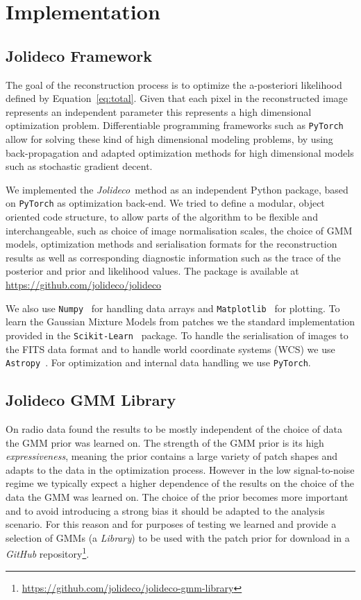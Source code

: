 \documentclass[twocolumn]{aastex631}
\newcommand{\jolideco}{\textit{Jolideco}~}
\begin{document}
    \section{Implementation}
    \subsection{Jolideco Framework}
    The goal of the reconstruction process is to optimize the a-posteriori
    likelihood defined by Equation~\ref{eq:total}. Given that each pixel
    in the reconstructed image represents an independent parameter
    this represents a high dimensional optimization problem.
    Differentiable programming frameworks such as \texttt{PyTorch}~\citep{Pytorch2019}
    allow for solving these kind of high dimensional modeling problems, by using
    back-propagation and adapted optimization methods for high dimensional
    models such as stochastic gradient decent.

    We implemented the \jolideco method as an independent Python package, 
    based on \texttt{PyTorch} as optimization back-end. We tried to define a modular,
    object oriented code structure, to allow parts of the algorithm to be
    flexible and interchangeable, such as choice of image normalisation scales,
    the choice of GMM models, optimization methods and serialisation formats for the 
    reconstruction results as well as corresponding diagnostic information
    such as the trace of the posterior and prior and likelihood values.
    The package is available at \url{https://github.com/jolideco/jolideco}

    We also use \texttt{Numpy}~\citep{Numpy2020} for handling data arrays and
    \texttt{Matplotlib}~\citep{Hunter2007} for plotting.
    To learn the Gaussian Mixture Models from patches we the standard implementation
    provided in the \texttt{Scikit-Learn}~\citep{Skimage2014} package. To handle the 
    serialisation of images to the FITS data format and to handle world coordinate
    systems (WCS) we use \texttt{Astropy}~\citep{Astropy2018}.
    For optimization and internal data handling we use \texttt{PyTorch}.

    \subsection{Jolideco GMM Library}
    \label{ssec:jolideco-gmm-library}
    On radio data \cite{Bouman2016} found the results to be mostly independent of the choice of data the GMM prior was learned on. The strength of the GMM prior is its high \textit{expressiveness}, meaning the prior contains a large variety of patch shapes and adapts to the data in the optimization process. However in the low signal-to-noise regime we typically expect a higher dependence of the results on the choice of the data the GMM was learned on. The choice of the prior becomes more important and to avoid introducing a strong bias it should be adapted to the analysis scenario. For this reason and for purposes of testing we learned and provide a selection of GMMs (a \textit{Library}) to be used with the patch prior for download in a \textit{GitHub} repository\footnote{\url{https://github.com/jolideco/jolideco-gmm-library}}.
    
\end{document}
